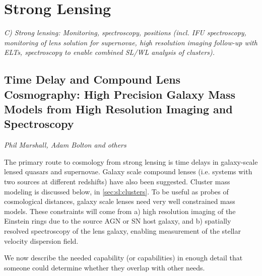 
\section{Strong Lensing}
\label{sec:sl}

{\em C) Strong lensing: Monitoring, spectroscopy, positions (incl. IFU
spectroscopy, monitoring of lens solution for supernovae, high
resolution imaging follow-up with ELTs, spectroscopy to enable combined
SL/WL analysis of clusters).}

%
%


\subsection{Time Delay and Compound Lens Cosmography: High Precision Galaxy Mass Models from High Resolution Imaging and Spectroscopy}
{\it Phil Marshall, Adam Bolton and others}

The primary route to cosmology from strong lensing is time delays in
galaxy-scale lensed quasars and supernovae. Galaxy scale compound lenses
(i.e. systems with two sources at different redshifts) have also been
suggested. Cluster mass modeling is discussed below, in \autoref{sec:sl:clusters}.
To be useful as probes of cosmological distances, galaxy scale lenses
need very well constrained mass models. These constraints will come from
a) high resolution imaging of the Einstein rings due to the source
AGN or SN host galaxy, and b) spatially resolved spectroscopy of the lens
galaxy, enabling measurement of the stellar velocity dispersion field.

We now describe the needed capability (or capabilities) in enough detail
that someone could determine whether they overlap with other needs.

